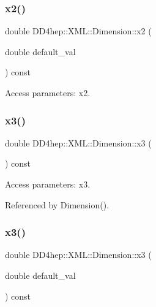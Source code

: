 \subsubsection{\texorpdfstring{x2()}{x2()}\hspace{0.1cm}{\footnotesize\ttfamily [2/2]}}
{\footnotesize\ttfamily double D\+D4hep\+::\+X\+M\+L\+::\+Dimension\+::x2 (\begin{DoxyParamCaption}\item[{double}]{default\+\_\+val }\end{DoxyParamCaption}) const}



Access parameters\+: x2. 

\hypertarget{struct_d_d4hep_1_1_x_m_l_1_1_dimension_aa6b66813bfe9de86719ca3b1826a9f73}{}\label{struct_d_d4hep_1_1_x_m_l_1_1_dimension_aa6b66813bfe9de86719ca3b1826a9f73} 
\subsubsection{\texorpdfstring{x3()}{x3()}\hspace{0.1cm}{\footnotesize\ttfamily [1/2]}}
{\footnotesize\ttfamily double D\+D4hep\+::\+X\+M\+L\+::\+Dimension\+::x3 (\begin{DoxyParamCaption}{ }\end{DoxyParamCaption}) const}



Access parameters\+: x3. 



Referenced by Dimension().

\hypertarget{struct_d_d4hep_1_1_x_m_l_1_1_dimension_a8ec7375d13124ceccac0930e3116b9dd}{}\label{struct_d_d4hep_1_1_x_m_l_1_1_dimension_a8ec7375d13124ceccac0930e3116b9dd} 
\subsubsection{\texorpdfstring{x3()}{x3()}\hspace{0.1cm}{\footnotesize\ttfamily [2/2]}}
{\footnotesize\ttfamily double D\+D4hep\+::\+X\+M\+L\+::\+Dimension\+::x3 (\begin{DoxyParamCaption}\item[{double}]{default\+\_\+val }\end{DoxyParamCaption}) const}



